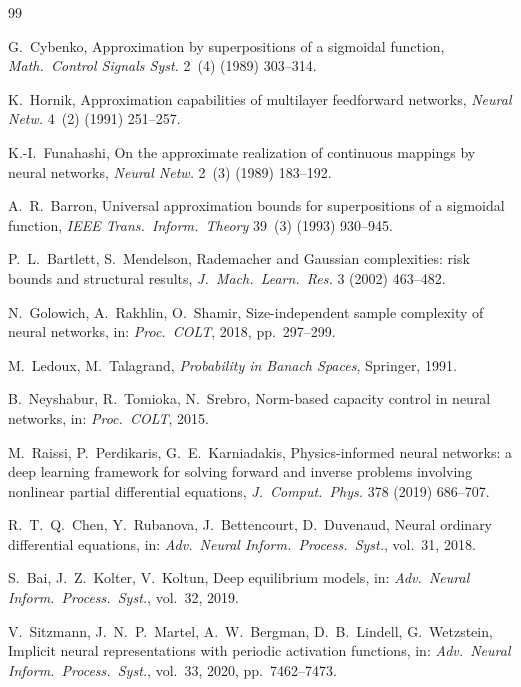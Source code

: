 \documentclass[12pt]{article}
\begin{document}

\begin{thebibliography}{99}

G.~Cybenko,
Approximation by superpositions of a sigmoidal function,
\emph{Math.\ Control Signals Syst.} 2~(4) (1989) 303--314.

K.~Hornik,
Approximation capabilities of multilayer feedforward networks,
\emph{Neural Netw.} 4~(2) (1991) 251--257.

K.-I.~Funahashi,
On the approximate realization of continuous mappings by neural
networks,
\emph{Neural Netw.} 2~(3) (1989) 183--192.

A.~R.~Barron,
Universal approximation bounds for superpositions of a sigmoidal
function,
\emph{IEEE Trans.\ Inform.\ Theory} 39~(3) (1993) 930--945.

P.~L.~Bartlett, S.~Mendelson,
Rademacher and Gaussian complexities: risk bounds and structural
results,
\emph{J.~Mach.\ Learn.\ Res.} 3 (2002) 463--482.

N.~Golowich, A.~Rakhlin, O.~Shamir,
Size-independent sample complexity of neural networks,
in: \emph{Proc.\ COLT}, 2018, pp.~297--299.

M.~Ledoux, M.~Talagrand,
\emph{Probability in Banach Spaces}, Springer, 1991.

B.~Neyshabur, R.~Tomioka, N.~Srebro,
Norm-based capacity control in neural networks,
in: \emph{Proc.\ COLT}, 2015.

M.~Raissi, P.~Perdikaris, G.~E.~Karniadakis,
Physics-informed neural networks: a deep learning framework for
solving forward and inverse problems involving nonlinear partial
differential equations,
\emph{J.~Comput.\ Phys.} 378 (2019) 686--707.

R.~T.~Q.~Chen, Y.~Rubanova, J.~Bettencourt, D.~Duvenaud,
Neural ordinary differential equations,
in: \emph{Adv.\ Neural Inform.\ Process.\ Syst.}, vol.~31, 2018.

S.~Bai, J.~Z.~Kolter, V.~Koltun,
Deep equilibrium models,
in: \emph{Adv.\ Neural Inform.\ Process.\ Syst.}, vol.~32, 2019.

V.~Sitzmann, J.~N.~P.~Martel, A.~W.~Bergman, D.~B.~Lindell,
G.~Wetzstein,
Implicit neural representations with periodic activation functions,
in: \emph{Adv.\ Neural Inform.\ Process.\ Syst.}, vol.~33, 2020,
pp.~7462--7473.


\end{thebibliography}
\end{document}

